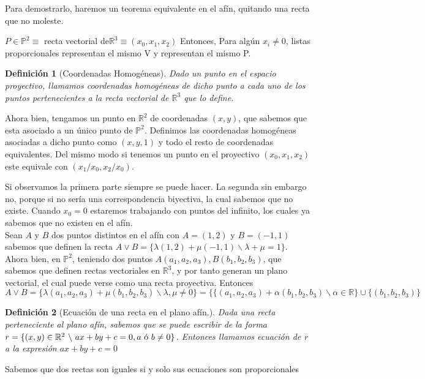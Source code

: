 \documentclass[11pt, a4paper]{article}
\makeatletter
\newif\IfInSansMode
\let\oldsf\sffamily
\renewcommand*{\sffamily}{\oldsf\mathversion{sans}\InSansModetrue}
\let\oldnorm\normalfont
\renewcommand*{\normalfont}{\oldnorm\InSansModefalse\mathversion{normal}}
\renewenvironment{proof}[1][\proofname] {\vspace{-15pt}\par\pushQED{\qed}\normalfont\topsep6\p@\@plus6\p@\relax\trivlist\item[\hskip\labelsep\it#1\@addpunct{.}]\ignorespaces}{\popQED\endtrivlist\@endpefalse}
\renewenvironment{proof}[1][\proofname] {\par\pushQED{\qed}\normalfont\topsep6\p@\@plus6\p@\relax\trivlist\item[\hskip\labelsep\itshape\sffamily#1\@addpunct{.}]\ignorespaces}{\popQED\endtrivlist\@endpefalse}
\theoremstyle{theorem-style}
\theoremstyle{definition-style}
\newtheorem{ndef}{Definición}[section]
\theoremstyle{remark-style}
\theoremstyle{example-style}
\makeatother
\begin{document}
\begin{proof}
	Para demostrarlo, haremos un teorema equivalente en el afín, quitando una recta que no moleste.
\end{proof}

	$P \in \mathbb{P}^2 \equiv$ recta vectorial de$ \mathbb{R}^3 \equiv (x_0,x_1,x_2) $
	Entonces, Para algún $x_i \ne 0$, listas proporcionales representan el mismo V y representan el mismo P.

\begin{ndef}[Coordenadas Homogéneas]
Dado un punto en el espacio proyectivo, llamamos coordenadas homogéneas de dicho punto a cada uno de los puntos pertenecientes a la recta vectorial de $\mathbb{R}^3$ que lo define.
\end{ndef}


Ahora bien, tengamos un punto en $\mathbb{R}^2$ de coordenadas $(x,y)$, que sabemos que esta asociado a un único punto de $\mathbb{P}^2$. Definimos las coordenadas homogéneas asociadas a dicho punto como $(x,y,1)$ y todo el resto de coordenadas equivalentes. Del mismo modo si tenemos un punto en el proyectivo  $(x_0, x_1, x_2)$ este equivale con $(x_1/x_0, x_2/x_0)$. 

Si observamos la primera parte siempre se puede hacer. La segunda sin embargo no, porque si no sería una correspondencia biyectiva, la cual sabemos que no existe. Cuando $x_0 = 0$ estaremos trabajando con puntos del infinito, los cuales ya sabemos que no existen en el afín.\\

Sean $A$ y $B$ dos puntos distintos en el afín con $A =(1,2)$ y $B=(-1,1)$ sabemos que definen la recta $A \vee B = \{ \lambda (1,2) + \mu (-1,1) \backslash \lambda + \mu = 1\}$.\\
Ahora bien, en $\mathbb{P}^2$, teniendo dos puntos $A(a_1,a_2,a_3), B(b_1,b_2,b_3)$, que sabemos que definen rectas vectoriales en $\mathbb{R}^3$, y por tanto generan un plano vectorial, el cual puede verse como una recta proyectiva. Entonces $A\vee B = \{ \lambda (a_1,a_2,a_3) + \mu (b_1,b_2,b_3)\backslash \lambda, \mu \ne 0 \} = \{  \{ (a_1,a_2,a_3) + \alpha (b_1,b_2,b_3)\backslash \alpha  \in \mathbb{R}\} \cup  \{(b_1,b_2,b_3) \}$
\begin{ndef}[Ecuación de una recta en el plano afín.]
Dada una recta perteneciente al plano afín, sabemos que se puede escribir de la forma $r = \{(x,y) \in \mathbb{R}^2\ \backslash\ ax + by + c = 0, a \textup{ ó } b \neq 0\}$. Entonces llamamos ecuación de r a la expresión $ax + by + c = 0$ 
\end{ndef}
Sabemos que dos rectas son iguales si y solo sus ecuaciones son proporcionales
\end{document}
